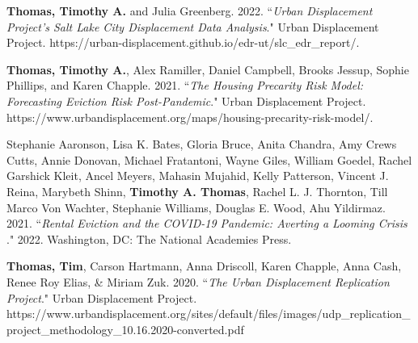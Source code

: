 

\begin{cvparagraph}

\textbf{Thomas, Timothy A.} and Julia Greenberg. 2022. “\emph{Urban Displacement Project’s Salt Lake City Displacement Data Analysis}." Urban Displacement Project. https://urban-displacement.github.io/edr-ut/slc\_edr\_report/.
\end{cvparagraph}

\begin{cvparagraph}

\textbf{Thomas, Timothy A.}, Alex Ramiller, Daniel Campbell, Brooks Jessup, Sophie Phillips, and Karen Chapple. 2021. “\emph{The Housing Precarity Risk Model: Forecasting Eviction Risk Post-Pandemic}." Urban Displacement Project. https://www.urbandisplacement.org/maps/housing-precarity-risk-model/.
\end{cvparagraph}


\begin{cvparagraph}

Stephanie Aaronson, Lisa K. Bates, Gloria Bruce, Anita Chandra, Amy Crews Cutts, Annie Donovan, Michael Fratantoni, Wayne Giles, William Goedel, Rachel Garshick Kleit, Ancel Meyers, Mahasin Mujahid, Kelly Patterson, Vincent J. Reina, Marybeth Shinn, \textbf{Timothy A. Thomas}, Rachel L. J. Thornton, Till Marco Von Wachter, Stephanie Williams, Douglas E. Wood, Ahu Yildirmaz. 2021. “\emph{Rental Eviction and the COVID-19 Pandemic: Averting a Looming Crisis}
." 2022. Washington, DC: The National Academies Press.
\end{cvparagraph}

\begin{cvparagraph}

\textbf{Thomas, Tim}, Carson Hartmann, Anna Driscoll, Karen Chapple, Anna Cash, Renee Roy Elias, \& Miriam Zuk. 2020. “\emph{The Urban Displacement Replication Project}." Urban Displacement Project. https://www.urbandisplacement.org/sites/default/files/images/\newline udp\_replication\_project\_methodology\_10.16.2020-converted.pdf
\end{cvparagraph}

